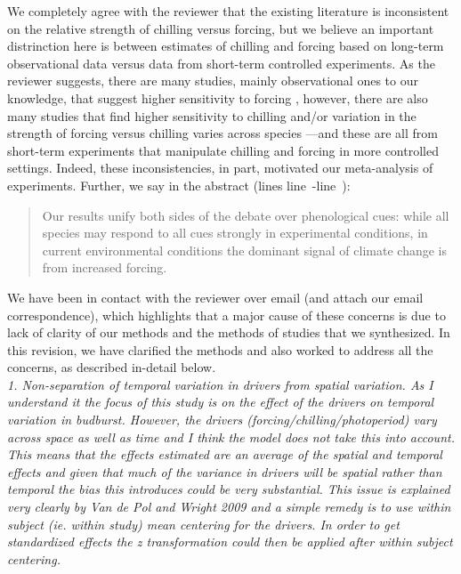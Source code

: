 \documentclass[11pt, a4paper]{article}
\newcommand{\lr}[1]{line~\lineref{#1}}
\begin{document}
We completely agree with the reviewer that the existing literature is inconsistent on the relative strength of chilling versus forcing, but we believe an important distrinction here is between estimates of chilling and forcing based on long-term observational data versus data from short-term controlled experiments. As the reviewer suggests, there are many studies, mainly observational ones to our knowledge, that suggest higher sensitivity to forcing \citep[e.g., ][]{fu2012,Rutishauser:2008},  however, there are also many studies that find higher sensitivity to chilling \citep[e.g., ][]{zohner2016, Laube:2014a,Heide:2005aa} and/or variation in the strength of forcing versus chilling varies across species \citep[e.g.,][]{harrington2015,Basler:2014aa,Caffarra:2011a,Caffarra:2011b,koerner2010a}---and these are all from short-term experiments that manipulate chilling and forcing in more controlled settings. Indeed, these inconsistencies, in part, motivated our meta-analysis of experiments. Further, we say in the abstract (lines \lr{unifydebatestart}-\lr{unifydebateend}):
\begin{quote}
Our results unify both sides of the debate over phenological cues: while all species may respond to all cues strongly in experimental conditions, in current environmental conditions the dominant signal of climate change is from increased forcing. 
\end{quote}

We have been in contact with the reviewer over email (and attach our email correspondence), which highlights that a major cause of these concerns is due to lack of clarity of our methods and the methods of studies that we synthesized. In this revision, we have clarified the methods and also worked to address all the concerns, as described in-detail below.\\

\emph{1. Non-separation of temporal variation in drivers from spatial variation. As I understand it the
focus of this study is on the effect of the drivers on temporal variation in budburst. However,
the drivers (forcing/chilling/photoperiod) vary across space as well as time and I think the
model does not take this into account. This means that the effects estimated are an average of
the spatial and temporal effects and given that much of the variance in drivers will be spatial
rather than temporal the bias this introduces could be very substantial. This issue is explained
very clearly by Van de Pol and Wright 2009 and a simple remedy is to use within subject (ie.
within study) mean centering for the drivers. In order to get standardized effects the z
transformation could then be applied after within subject centering.}\\
\end{document}
